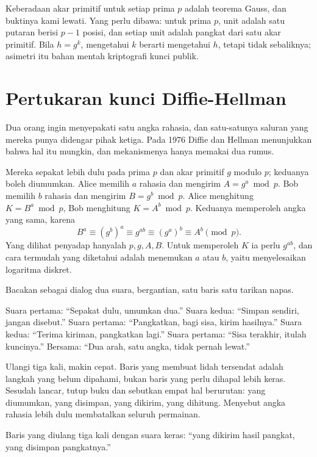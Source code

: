 Keberadaan akar primitif untuk setiap prima $p$ adalah teorema Gauss, dan buktinya kami
lewati. Yang perlu dibawa: untuk prima $p$, unit adalah satu putaran berisi $p-1$ posisi, dan
setiap unit adalah pangkat dari satu akar primitif. Bila $h=g^k$, mengetahui $k$ berarti
mengetahui $h$, tetapi tidak sebaliknya; asimetri itu bahan mentah kriptografi kunci publik.


\section{Pertukaran kunci Diffie-Hellman}

Dua orang ingin menyepakati satu angka rahasia, dan satu-satunya saluran yang mereka punya
didengar pihak ketiga. Pada 1976 Diffie dan Hellman menunjukkan bahwa hal itu mungkin, dan
mekanismenya hanya memakai dua rumus.

Mereka sepakat lebih dulu pada prima $p$ dan akar primitif $g$ modulo $p$; keduanya boleh
diumumkan. Alice memilih $a$ rahasia dan mengirim $A=g^a\bmod p$. Bob memilih $b$ rahasia dan
mengirim $B=g^b\bmod p$. Alice menghitung $K=B^a\bmod p$, Bob menghitung $K=A^b\bmod p$.
Keduanya memperoleh angka yang sama, karena
\[
B^a\equiv(g^b)^a\equiv g^{ab}\equiv(g^a)^b\equiv A^b\pmod p .
\]
Yang dilihat penyadap hanyalah $p,g,A,B$. Untuk memperoleh $K$ ia perlu $g^{ab}$, dan cara
termudah yang diketahui adalah menemukan $a$ atau $b$, yaitu menyelesaikan logaritma diskret.

\begin{bacakeras}
Bacakan sebagai dialog dua suara, bergantian, satu baris satu tarikan napas.

Suara pertama: ``Sepakat dulu, umumkan dua.''
Suara kedua: ``Simpan sendiri, jangan disebut.''
Suara pertama: ``Pangkatkan, bagi sisa, kirim hasilnya.''
Suara kedua: ``Terima kiriman, pangkatkan lagi.''
Suara pertama: ``Sisa terakhir, itulah kuncinya.''
Bersama: ``Dua arah, satu angka, tidak pernah lewat.''

Ulangi tiga kali, makin cepat. Baris yang membuat lidah tersendat adalah langkah yang belum
dipahami, bukan baris yang perlu dihapal lebih keras. Sesudah lancar, tutup buku dan sebutkan
empat hal berurutan: yang diumumkan, yang disimpan, yang dikirim, yang dihitung. Menyebut angka
rahasia lebih dulu membatalkan seluruh permainan.

Baris yang diulang tiga kali dengan suara keras: ``yang dikirim hasil pangkat, yang disimpan
pangkatnya.''
\end{bacakeras}


